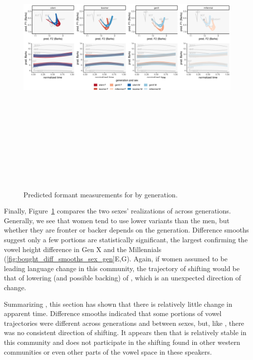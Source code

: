 \begin{figure}[p]
	\centering
	\includegraphics[angle = 90, origin = c, height = 6in]{Figures/BOUGHT/BOUGHT_sex_panel_plot_wide.pdf}
	\caption[Predicted formant measurements for \thought by generation.]{Predicted formant measurements for \thought by generation.}
	\label{fig:BOUGHT_sex_panel_plot_wide}
\end{figure}

Finally, Figure~\ref{fig:BOUGHT_sex_panel_plot_wide} compares the two sexes' realizations of \thought across generations. Generally, we see that women tend to use lower variants than the men, but whether they are fronter or backer depends on the generation. Difference smooths suggest only a few portions are statistically significant, the largest confirming the vowel height difference in Gen X and the Millennials (\ref{fig:bought_diff_smooths_sex_gen}E,G). Again, if women assumed to be leading language change in this community, the trajectory of shifting would be that of lowering (and possible backing) of \thought, which is an unexpected direction of change.

Summarizing \thought, this section has shown that there is relatively little change in apparent time. Difference smooths indicated that some portions of vowel trajectories were different across generations and between sexes, but, like \lot, there was no consistent direction of shifting. It appears then that \thought is relatively stable in this community and does not participate in the shifting found in other western communities or even other parts of the vowel space in these speakers.

